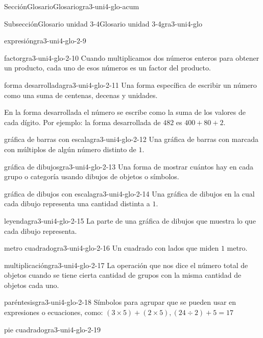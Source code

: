 \documentclass[twoside,10pt,]{article}
\begin{document}
\begin{sectionptx}{Sección}{Glosario}{}{Glosario}{}{}{gra3-uni4-glo-acum}
\begin{subsectionptx}{Subsección}{Glosario unidad 3-4}{}{Glosario unidad 3-4}{}{}{gra3-uni4-glo}
\begin{descriptionlist}
\begin{dlimedium}{expresión}{gra3-uni4-glo-2-9}
\end{dlimedium}%
\begin{dlimedium}{factor}{gra3-uni4-glo-2-10}%
Cuando multiplicamos dos números enteros para obtener un producto, cada uno de esos números es un factor del producto.%
\end{dlimedium}%
\begin{dlimedium}{forma desarrollada}{gra3-uni4-glo-2-11}%
Una forma específica de escribir un número como una suma de centenas, decenas y unidades.%
\par
En la forma desarrollada el número se escribe como la suma de los valores de cada dígito. Por ejemplo: la forma desarrollada de \(482\) es \(400 + 80 + 2\).%
\end{dlimedium}%
\begin{dlimedium}{gráfica de barras con escala}{gra3-uni4-glo-2-12}%
Una gráfica de barras con marcada con múltiplos de algún número distinto de \(1\).%
\end{dlimedium}%
\begin{dlimedium}{gráfica de dibujos}{gra3-uni4-glo-2-13}%
Una forma de mostrar cuántos hay en cada grupo o categoría usando dibujos de objetos o símbolos.%
\end{dlimedium}%
\begin{dlimedium}{gráfica de dibujos con escala}{gra3-uni4-glo-2-14}%
Una gráfica de dibujos en la cual cada dibujo representa una cantidad distinta a \(1\).%
\end{dlimedium}%
\begin{dlimedium}{leyenda}{gra3-uni4-glo-2-15}%
La parte de una gráfica de dibujos que muestra lo que cada dibujo representa.%
\end{dlimedium}%
\begin{dlimedium}{metro cuadrado}{gra3-uni4-glo-2-16}%
Un cuadrado con lados que miden \(1\) metro.%
\end{dlimedium}%
\begin{dlimedium}{multiplicación}{gra3-uni4-glo-2-17}%
La operación que nos dice el número total de objetos cuando se tiene cierta cantidad de grupos con la misma cantidad de objetos cada uno.%
\end{dlimedium}%
\begin{dlimedium}{paréntesis}{gra3-uni4-glo-2-18}%
Símbolos para agrupar que se pueden usar en expresiones o ecuaciones, como: \((3 \times 5) + (2 \times 5), (24 \div 2) + 5 = 17\)%
\end{dlimedium}%
\begin{dlimedium}{pie cuadrado}{gra3-uni4-glo-2-19}%

\end{dlimedium}
\end{descriptionlist}
\end{subsectionptx}
\end{sectionptx}
\end{document}
